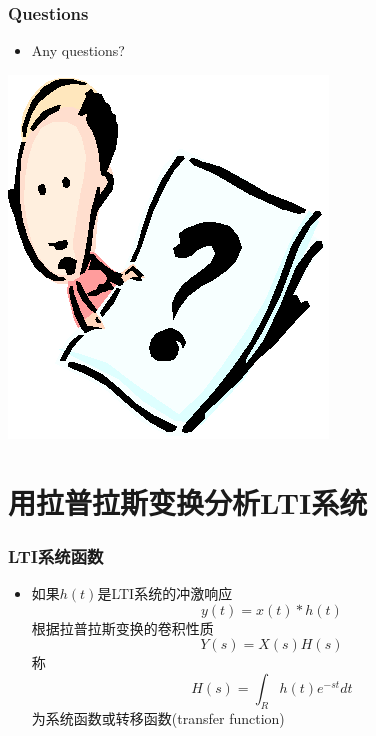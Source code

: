 \documentclass[CJKutf8,dvipsnames,table]{beamer}
\begin{document}
\begin{CJK*}{UTF8}{song}
  \begin{frame}
    \frametitle{Questions}
    \begin{itemize}
    \item Any questions?
    \end{itemize}
    \begin{center}
      \includegraphics[scale=.5]{question}
    \end{center}
  \end{frame}   
  
  \section{用拉普拉斯变换分析LTI系统}
  
  \begin{frame}
    \frametitle{LTI系统函数}
    \begin{itemize}
    \item 如果$h(t)$是LTI系统的冲激响应
    \[
    	y(t) = x(t) \ast h(t)
    \]
    根据拉普拉斯变换的卷积性质
    \[
    	Y(s) = X(s)H(s)
    \]
	称
	\[
	H(s) = \int_R h(t)e^{-st}dt
	\]
	为系统函数或转移函数(transfer function)
    \end{itemize}
  \end{frame}   
  

\end{CJK*}
\end{document}
